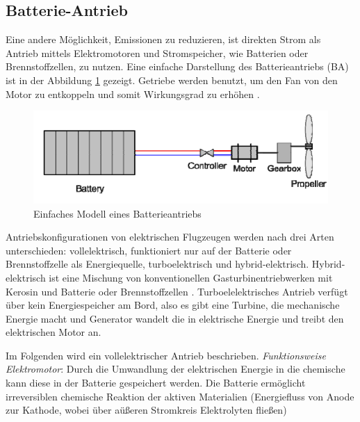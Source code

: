 \subsection{Batterie-Antrieb}
Eine andere Möglichkeit, Emissionen zu reduzieren, ist direkten Strom als Antrieb mittels Elektromotoren und Stromspeicher, wie Batterien oder Brennstoffzellen, zu nutzen.
Eine einfache Darstellung des Batterieantriebs (BA) ist in der Abbildung \ref{ba} gezeigt. Getriebe werden benutzt, um den Fan von den Motor
zu entkoppeln und somit Wirkungsgrad zu erhöhen \cite{hepperle2012electric}.
%
\begin{figure}[h]
	\centering
	\includegraphics[width=0.7\linewidth]{Bilder/BA.png}
	\caption[Einfaches Modell eines Batterieantriebs]{Einfaches Modell eines Batterieantriebs \cite{hepperle2012electric}}
	\label{ba}
\end{figure}

Antriebskonfigurationen von elektrischen Flugzeugen werden nach drei Arten unterschieden: vollelektrisch, funktioniert nur auf der Batterie oder
Brennstoffzelle als Energiequelle, turboelektrisch und hybrid-elektrisch. Hybrid-elektrisch ist eine Mischung von konventionellen 
Gasturbinentriebwerken mit Kerosin und Batterie oder Brennstoffzellen \cite{dahal2021techno}. Turboelelektrisches Antrieb verfügt über
kein Energiespeicher am Bord, also es gibt eine Turbine, 
die mechanische Energie macht und Generator wandelt die in elektrische Energie und treibt den elektrischen Motor an. %

Im Folgenden wird ein vollelektrischer Antrieb beschrieben.
%
\textit{Funktionsweise Elektromotor}: 
Durch die Umwandlung der elektrischen Energie in die chemische kann diese in der Batterie gespeichert werden.
Die Batterie ermöglicht irreversiblen chemische Reaktion der aktiven Materialien (Energiefluss von Anode zur Kathode, wobei über aüßeren Stromkreis Elektrolyten fließen)

